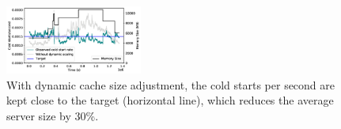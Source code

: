 \begin{figure}[t]
    \vspace*{\myfigspace}
  \centering 
  \includegraphics[width=0.4\textwidth]{../graphs/dyn-scale-392-b.pdf}
    \vspace*{\myfigspace}
  \caption{With dynamic cache size adjustment, the cold starts per second are kept close to the target (horizontal line), which reduces the average server size by 30\%. }
  \label{fig:dynamic}
  \vspace*{\myfigspace}
\end{figure}


